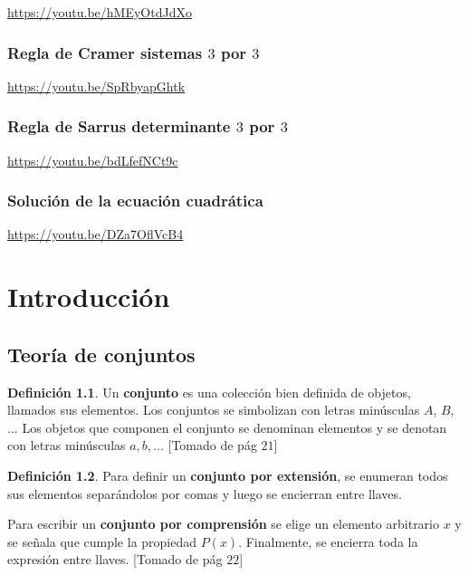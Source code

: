\documentclass[]{book}
\theoremstyle{definition}
\newtheorem{definition}{Definición}[chapter]
\theoremstyle{definition}
\theoremstyle{definition}
\theoremstyle{remark}
\begin{document}
\url{https://youtu.be/hMEyOtdJdXo}

\hypertarget{regla-de-cramer-sistemas-3-por-3}{%
\subsection{\texorpdfstring{Regla de Cramer sistemas \(3\) por \(3\)}{Regla de Cramer sistemas 3 por 3}}\label{regla-de-cramer-sistemas-3-por-3}}

\url{https://youtu.be/SpRbyapGhtk}

\hypertarget{regla-de-sarrus-determinante-3-por-3}{%
\subsection{\texorpdfstring{Regla de Sarrus determinante \(3\) por \(3\)}{Regla de Sarrus determinante 3 por 3}}\label{regla-de-sarrus-determinante-3-por-3}}

\url{https://youtu.be/bdLfefNCt9c}

\hypertarget{soluciuxf3n-de-la-ecuaciuxf3n-cuadruxe1tica}{%
\subsection{Solución de la ecuación cuadrática}\label{soluciuxf3n-de-la-ecuaciuxf3n-cuadruxe1tica}}

\url{https://youtu.be/DZa7OflVcB4}

\hypertarget{intro}{%
\chapter{Introducción}\label{intro}}

\hypertarget{teoruxeda-de-conjuntos}{%
\section{Teoría de conjuntos}\label{teoruxeda-de-conjuntos}}

\begin{definition}
\protect\hypertarget{def:unnamed-chunk-2}{}{\label{def:unnamed-chunk-2} }Un \textbf{conjunto} es una colección bien definida de objetos, llamados sus elementos. Los conjuntos se simbolizan con letras minúsculas \(A\), \(B\), \(...\) Los objetos que componen el conjunto se denominan elementos y se denotan con letras minúsculas \(a, b, ...\) {[}Tomado de \citep{zill2012algebra} pág \(21\){]}
\end{definition}

\begin{definition}
\protect\hypertarget{def:unnamed-chunk-3}{}{\label{def:unnamed-chunk-3} }Para definir un \textbf{conjunto por extensión}, se enumeran todos sus elementos separándolos por comas y luego se encierran entre llaves.

Para escribir un \textbf{conjunto por comprensión} se elige un elemento arbitrario \(x\) y se señala que cumple la propiedad \(P(x)\). Finalmente, se encierra toda la expresión entre llaves. {[}Tomado de \citep{zill2012algebra} pág \(22\){]}
\end{definition}
\end{document}
